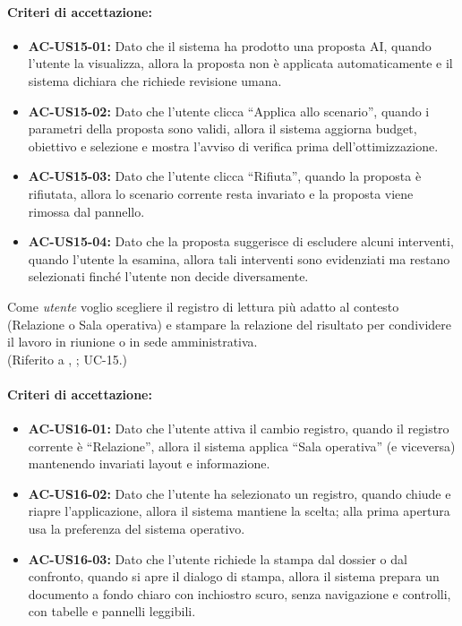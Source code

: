 \paragraph{Criteri di accettazione:}
\begin{itemize}[leftmargin=1.4em]
    \item \textbf{AC-US15-01:} Dato che il sistema ha prodotto una proposta AI, quando l'utente la visualizza, allora la proposta non è applicata automaticamente e il sistema dichiara che richiede revisione umana.
    \item \textbf{AC-US15-02:} Dato che l'utente clicca ``Applica allo scenario'', quando i parametri della proposta sono validi, allora il sistema aggiorna budget, obiettivo e selezione e mostra l'avviso di verifica prima dell'ottimizzazione.
    \item \textbf{AC-US15-03:} Dato che l'utente clicca ``Rifiuta'', quando la proposta è rifiutata, allora lo scenario corrente resta invariato e la proposta viene rimossa dal pannello.
    \item \textbf{AC-US15-04:} Dato che la proposta suggerisce di escludere alcuni interventi, quando l'utente la esamina, allora tali interventi sono evidenziati ma restano selezionati finché l'utente non decide diversamente.
\end{itemize}

 \label{us:tema}
Come \textit{utente} voglio scegliere il registro di lettura più adatto al contesto (Relazione o Sala operativa) e stampare la relazione del risultato per condividere il lavoro in riunione o in sede amministrativa. \\ (Riferito a , ; UC-15.)

\paragraph{Criteri di accettazione:}
\begin{itemize}[leftmargin=1.4em]
    \item \textbf{AC-US16-01:} Dato che l'utente attiva il cambio registro, quando il registro corrente è ``Relazione'', allora il sistema applica ``Sala operativa'' (e viceversa) mantenendo invariati layout e informazione.
    \item \textbf{AC-US16-02:} Dato che l'utente ha selezionato un registro, quando chiude e riapre l'applicazione, allora il sistema mantiene la scelta; alla prima apertura usa la preferenza del sistema operativo.
    \item \textbf{AC-US16-03:} Dato che l'utente richiede la stampa dal dossier o dal confronto, quando si apre il dialogo di stampa, allora il sistema prepara un documento a fondo chiaro con inchiostro scuro, senza navigazione e controlli, con tabelle e pannelli leggibili.
\end{itemize}

